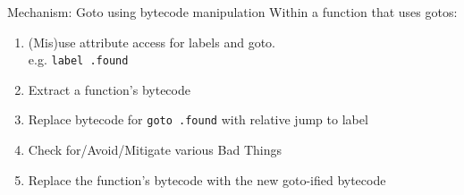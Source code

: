 \documentclass{beamer}
\begin{document}
\begin{frame}[fragile]{Mechanism: Goto using bytecode manipulation}
%
    Within a function that uses gotos:

\begin{enumerate}
    \item (Mis)use attribute access for labels and goto.\\ e.g. \texttt{label .found}
    \item Extract a function's bytecode
    \item Replace bytecode for \texttt{goto .found} with relative jump to label
    \item Check for/Avoid/Mitigate various Bad Things
    \item Replace the function's bytecode with the new goto-ified bytecode
\end{enumerate}
%
\end{frame}
\end{document}

